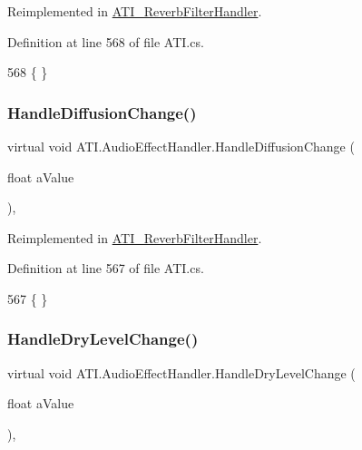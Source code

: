 Reimplemented in \hyperlink{class_a_t_i___reverb_filter_handler_a4a95ee1076720663fbe84e624385e636}{A\+T\+I\+\_\+\+Reverb\+Filter\+Handler}.



Definition at line 568 of file A\+T\+I.\+cs.


\begin{DoxyCode}
568 \{ \}
\end{DoxyCode}
\mbox{\label{class_a_t_i_1_1_audio_effect_handler_adcf777de620420b6c411350db0eca2aa}} 
\subsubsection{\texorpdfstring{Handle\+Diffusion\+Change()}{HandleDiffusionChange()}}
{\footnotesize\ttfamily virtual void A\+T\+I.\+Audio\+Effect\+Handler.\+Handle\+Diffusion\+Change (\begin{DoxyParamCaption}\item[{float}]{a\+Value }\end{DoxyParamCaption})\hspace{0.3cm}{\ttfamily [protected]}, {\ttfamily [virtual]}}



Reimplemented in \hyperlink{class_a_t_i___reverb_filter_handler_a6cd79af5d1835bd4ab8a6420fed82e53}{A\+T\+I\+\_\+\+Reverb\+Filter\+Handler}.



Definition at line 567 of file A\+T\+I.\+cs.


\begin{DoxyCode}
567 \{ \}
\end{DoxyCode}
\mbox{\label{class_a_t_i_1_1_audio_effect_handler_abf6b4a6ead7e60bbaea15f94936c316e}} 
\subsubsection{\texorpdfstring{Handle\+Dry\+Level\+Change()}{HandleDryLevelChange()}}
{\footnotesize\ttfamily virtual void A\+T\+I.\+Audio\+Effect\+Handler.\+Handle\+Dry\+Level\+Change (\begin{DoxyParamCaption}\item[{float}]{a\+Value }\end{DoxyParamCaption})\hspace{0.3cm}{\ttfamily [protected]}, {\ttfamily [virtual]}}



